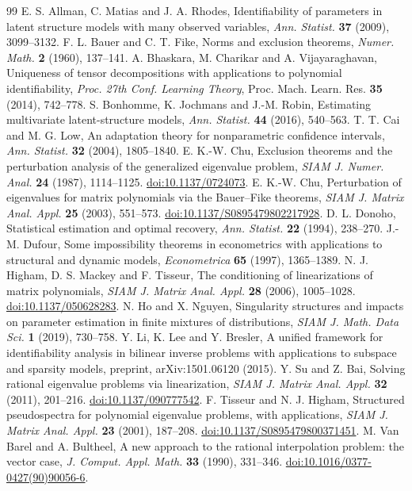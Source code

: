 \begin{thebibliography}{99}
 E. S. Allman, C. Matias and J. A. Rhodes,
Identifiability of parameters in latent structure models with many
observed variables, \emph{Ann. Statist.} \textbf{37} (2009), 3099--3132.
 F. L. Bauer and C. T. Fike,
Norms and exclusion theorems, \emph{Numer. Math.} \textbf{2} (1960), 137--141.
 A. Bhaskara, M. Charikar and A. Vijayaraghavan,
Uniqueness of tensor decompositions with applications to polynomial
identifiability, \emph{Proc. 27th Conf. Learning Theory},
Proc. Mach. Learn. Res. \textbf{35} (2014), 742--778.
 S. Bonhomme, K. Jochmans and J.-M. Robin,
Estimating multivariate latent-structure models,
\emph{Ann. Statist.} \textbf{44} (2016), 540--563.
 T. T. Cai and M. G. Low,
An adaptation theory for nonparametric confidence intervals,
\emph{Ann. Statist.} \textbf{32} (2004), 1805--1840.
 E. K.-W. Chu,
Exclusion theorems and the perturbation analysis of the generalized
eigenvalue problem, \emph{SIAM J. Numer. Anal.} \textbf{24} (1987),
1114--1125. \href{https://doi.org/10.1137/0724073}{doi:10.1137/0724073}.
 E. K.-W. Chu,
Perturbation of eigenvalues for matrix polynomials via the Bauer--Fike
theorems, \emph{SIAM J. Matrix Anal. Appl.} \textbf{25} (2003), 551--573.
\href{https://doi.org/10.1137/S0895479802217928}{doi:10.1137/S0895479802217928}.
 D. L. Donoho, Statistical estimation and optimal recovery,
\emph{Ann. Statist.} \textbf{22} (1994), 238--270.
 J.-M. Dufour, Some impossibility theorems in econometrics
with applications to structural and dynamic models,
\emph{Econometrica} \textbf{65} (1997), 1365--1389.
 N. J. Higham, D. S. Mackey and F. Tisseur,
The conditioning of linearizations of matrix polynomials,
\emph{SIAM J. Matrix Anal. Appl.} \textbf{28} (2006), 1005--1028.
\href{https://doi.org/10.1137/050628283}{doi:10.1137/050628283}.
 N. Ho and X. Nguyen, Singularity structures and impacts on
parameter estimation in finite mixtures of distributions,
\emph{SIAM J. Math. Data Sci.} \textbf{1} (2019), 730--758.
 Y. Li, K. Lee and Y. Bresler,
A unified framework for identifiability analysis in bilinear inverse
problems with applications to subspace and sparsity models,
preprint, arXiv:1501.06120 (2015).
 Y. Su and Z. Bai,
Solving rational eigenvalue problems via linearization,
\emph{SIAM J. Matrix Anal. Appl.} \textbf{32} (2011), 201--216.
\href{https://doi.org/10.1137/090777542}{doi:10.1137/090777542}.
 F. Tisseur and N. J. Higham,
Structured pseudospectra for polynomial eigenvalue problems, with
applications, \emph{SIAM J. Matrix Anal. Appl.} \textbf{23} (2001), 187--208.
\href{https://doi.org/10.1137/S0895479800371451}{doi:10.1137/S0895479800371451}.
 M. Van Barel and A. Bultheel,
A new approach to the rational interpolation problem: the vector case,
\emph{J. Comput. Appl. Math.} \textbf{33} (1990), 331--346.
\href{https://doi.org/10.1016/0377-0427(90)90056-6}{doi:10.1016/0377-0427(90)90056-6}.
\end{thebibliography}
